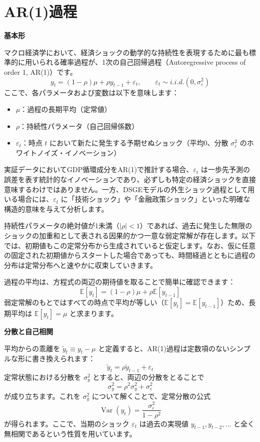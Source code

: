 \documentclass[
  japanese,
  lualatex,
  ja=standard,
  12pt,
  a4paper]{ltjsarticle}
\providecommand{\tightlist}{%
  \setlength{\itemsep}{0pt}\setlength{\parskip}{0pt}}
\begin{document}
\section{AR(1)過程}\label{ar1ux904eux7a0b}

\textbf{基本形}

マクロ経済学において、経済ショックの動学的な持続性を表現するために最も標準的に用いられる確率過程が、1次の自己回帰過程（Autoregressive
process of order 1, AR(1)）です。 \[
y_t=(1-\rho)\mu+\rho y_{t-1}+\varepsilon_t,
\qquad
\varepsilon_t\sim i.i.d.(0,\sigma_\varepsilon^2)
\] ここで、各パラメータおよび変数は以下を意味します：

\begin{itemize}
\tightlist
\item
  \(\mu\)：過程の長期平均（定常値）
\item
  \(\rho\)：持続性パラメータ（自己回帰係数）
\item
  \(\varepsilon_t\)：時点 \(t\)
  において新たに発生する予期せぬショック（平均0、分散
  \(\sigma_\varepsilon^2\) のホワイトノイズ・イノベーション）
\end{itemize}

実証データにおいてGDP循環成分をAR(1)で推計する場合、\(\varepsilon_t\)
は一歩先予測の誤差を表す統計的なイノベーションであり、必ずしも特定の経済ショックを直接意味するわけではありません。一方、DSGEモデルの外生ショック過程として用いる場合には、\(\varepsilon_t\)
に「技術ショック」や「金融政策ショック」といった明確な構造的意味を与えて分析します。

持続性パラメータの絶対値が1未満（\(|\rho|<1\)）であれば、過去に発生した無限のショックの加重和として表される因果的かつ一意な弱定常解が存在します。以下では、初期値もこの定常分布から生成されていると仮定します。なお、仮に任意の固定された初期値からスタートした場合であっても、時間経過とともに過程の分布は定常分布へと速やかに収束していきます。

過程の平均は、方程式の両辺の期待値を取ることで簡単に確認できます： \[
\mathbb{E}[y_t]
=
(1-\rho)\mu+\rho\mathbb{E}[y_{t-1}]
\]
弱定常解のもとではすべての時点で平均が等しい（\(\mathbb{E}[y_t]=\mathbb{E}[y_{t-1}]\)）ため、長期平均は
\(\mathbb{E}[y_t]=\mu\) と求まります。


\textbf{分散と自己相関}

平均からの乖離を \(\tilde{y}_t\equiv y_t-\mu\)
と定義すると、AR(1)過程は定数項のないシンプルな形に書き換えられます： \[
\tilde{y}_t=\rho\tilde{y}_{t-1}+\varepsilon_t
\] 定常状態における分散を \(\sigma_y^2\)
とすると、両辺の分散をとることで \[
\sigma_y^2
=
\rho^2\sigma_y^2+\sigma_\varepsilon^2
\] が成り立ちます。これを \(\sigma_y^2\)
について解くことで、定常分散の公式 \[
\operatorname{Var}(y_t)
=
\frac{\sigma_\varepsilon^2}{1-\rho^2}
\] が得られます。ここで、当期のショック \(\varepsilon_t\) は過去の実現値
\(y_{t-1}, y_{t-2}, \ldots\)
と全く無相関であるという性質を用いています。
\end{document}
